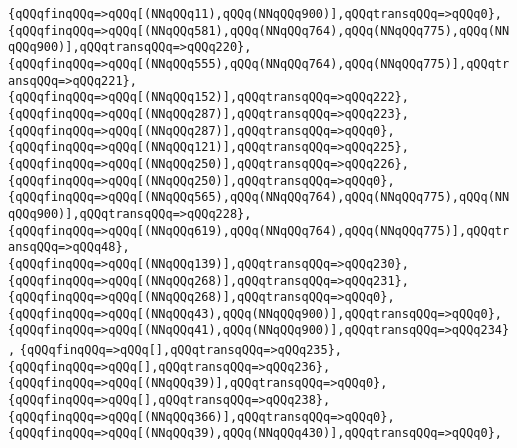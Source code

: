 \verb|{qQQqfinqQQq=>qQQq[(NNqQQq11),qQQq(NNqQQq900)],qQQqtransqQQq=>qQQq0},|\newline
\verb|{qQQqfinqQQq=>qQQq[(NNqQQq581),qQQq(NNqQQq764),qQQq(NNqQQq775),qQQq(NNqQQq900)],qQQqtransqQQq=>qQQq220},|\newline
\verb|{qQQqfinqQQq=>qQQq[(NNqQQq555),qQQq(NNqQQq764),qQQq(NNqQQq775)],qQQqtransqQQq=>qQQq221},|\newline
\verb|{qQQqfinqQQq=>qQQq[(NNqQQq152)],qQQqtransqQQq=>qQQq222},|\newline
\verb|{qQQqfinqQQq=>qQQq[(NNqQQq287)],qQQqtransqQQq=>qQQq223},|\newline
\verb|{qQQqfinqQQq=>qQQq[(NNqQQq287)],qQQqtransqQQq=>qQQq0},|\newline
\verb|{qQQqfinqQQq=>qQQq[(NNqQQq121)],qQQqtransqQQq=>qQQq225},|\newline
\verb|{qQQqfinqQQq=>qQQq[(NNqQQq250)],qQQqtransqQQq=>qQQq226},|\newline
\verb|{qQQqfinqQQq=>qQQq[(NNqQQq250)],qQQqtransqQQq=>qQQq0},|\newline
\verb|{qQQqfinqQQq=>qQQq[(NNqQQq565),qQQq(NNqQQq764),qQQq(NNqQQq775),qQQq(NNqQQq900)],qQQqtransqQQq=>qQQq228},|\newline
\verb|{qQQqfinqQQq=>qQQq[(NNqQQq619),qQQq(NNqQQq764),qQQq(NNqQQq775)],qQQqtransqQQq=>qQQq48},|\newline
\verb|{qQQqfinqQQq=>qQQq[(NNqQQq139)],qQQqtransqQQq=>qQQq230},|\newline
\verb|{qQQqfinqQQq=>qQQq[(NNqQQq268)],qQQqtransqQQq=>qQQq231},|\newline
\verb|{qQQqfinqQQq=>qQQq[(NNqQQq268)],qQQqtransqQQq=>qQQq0},|\newline
\verb|{qQQqfinqQQq=>qQQq[(NNqQQq43),qQQq(NNqQQq900)],qQQqtransqQQq=>qQQq0},|\newline
\verb|{qQQqfinqQQq=>qQQq[(NNqQQq41),qQQq(NNqQQq900)],qQQqtransqQQq=>qQQq234},|\newline
\verb|{qQQqfinqQQq=>qQQq[],qQQqtransqQQq=>qQQq235},|\newline
\verb|{qQQqfinqQQq=>qQQq[],qQQqtransqQQq=>qQQq236},|\newline
\verb|{qQQqfinqQQq=>qQQq[(NNqQQq39)],qQQqtransqQQq=>qQQq0},|\newline
\verb|{qQQqfinqQQq=>qQQq[],qQQqtransqQQq=>qQQq238},|\newline
\verb|{qQQqfinqQQq=>qQQq[(NNqQQq366)],qQQqtransqQQq=>qQQq0},|\newline
\verb|{qQQqfinqQQq=>qQQq[(NNqQQq39),qQQq(NNqQQq430)],qQQqtransqQQq=>qQQq0},|\newline
